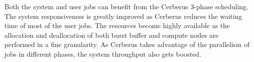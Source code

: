 Both the system and user jobs can benefit from the Cerberus 3-phase scheduling.
The system responsiveness is greatly improved as Cerberus reduces the waiting time of most of the user jobs.
The resources become highly available as the allocation and deallocation of
both burst buffer and compute nodes are performed in a fine granularity. 
As Cerberus takes advantage of the parallelism of jobs in different phases, the system throughput also gets boosted.

